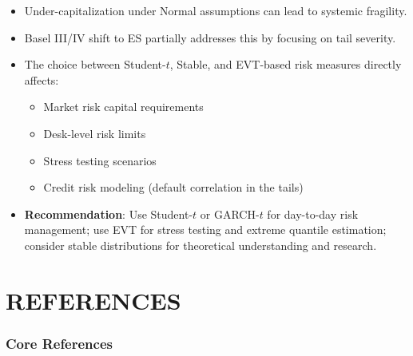 \documentclass[11pt, a4paper]{article}
\theoremstyle{definition}
\begin{document}
\begin{itemize}
  \item Under-capitalization under Normal assumptions can lead to systemic fragility.
  \item Basel III/IV shift to ES partially addresses this by focusing on tail severity.
  \item The choice between Student-$t$, Stable, and EVT-based risk measures directly affects:
  \begin{itemize}
    \item Market risk capital requirements
    \item Desk-level risk limits
    \item Stress testing scenarios
    \item Credit risk modeling (default correlation in the tails)
  \end{itemize}
  \item \textbf{Recommendation}: Use Student-$t$ or GARCH-$t$ for day-to-day risk management; use EVT for stress testing and extreme quantile estimation; consider stable distributions for theoretical understanding and research.
\end{itemize}


\part{REFERENCES}

\section{Core References}
\end{document}
